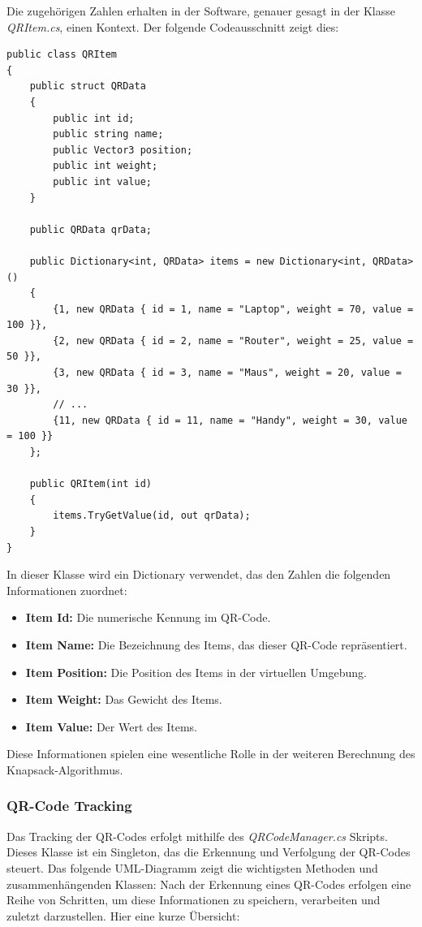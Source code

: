 Die zugehörigen Zahlen erhalten in der Software, genauer gesagt in der Klasse \textit{QRItem.cs}, einen Kontext. Der folgende Codeausschnitt zeigt dies:

\begin{lstlisting}[style=csharp, caption={}, label=code:update]
public class QRItem
{
    public struct QRData
    {
        public int id;
        public string name;
        public Vector3 position;
        public int weight;
        public int value;
    }

    public QRData qrData;

    public Dictionary<int, QRData> items = new Dictionary<int, QRData>()
    {
        {1, new QRData { id = 1, name = "Laptop", weight = 70, value = 100 }},
        {2, new QRData { id = 2, name = "Router", weight = 25, value = 50 }},
        {3, new QRData { id = 3, name = "Maus", weight = 20, value = 30 }},
        // ...
        {11, new QRData { id = 11, name = "Handy", weight = 30, value = 100 }}
    };

    public QRItem(int id)
    {
        items.TryGetValue(id, out qrData);
    }
}
\end{lstlisting}

In dieser Klasse wird ein Dictionary verwendet, das den Zahlen die folgenden Informationen zuordnet:

\begin{itemize}
    \item \textbf{Item Id:} Die numerische Kennung im QR-Code.
    \item \textbf{Item Name:} Die Bezeichnung des Items, das dieser QR-Code repräsentiert.
    \item \textbf{Item Position:} Die Position des Items in der virtuellen Umgebung.
    \item \textbf{Item Weight:} Das Gewicht des Items.
    \item \textbf{Item Value:} Der Wert des Items.
\end{itemize}

Diese Informationen spielen eine wesentliche Rolle in der weiteren Berechnung des Knapsack-Algorithmus.

\subsubsection{QR-Code Tracking}
Das Tracking der QR-Codes erfolgt mithilfe des \textit{QRCodeManager.cs} Skripts. Dieses Klasse ist ein Singleton, das
die Erkennung und Verfolgung der QR-Codes steuert.
Das folgende UML-Diagramm zeigt die wichtigsten Methoden und zusammenhängenden Klassen:
Nach der Erkennung eines QR-Codes erfolgen eine Reihe von Schritten, um diese Informationen zu speichern, verarbeiten
und zuletzt darzustellen.
Hier eine kurze Übersicht:

